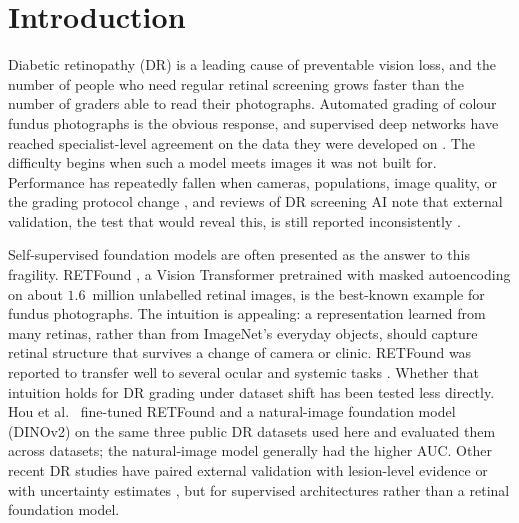 \documentclass[journal]{IEEEtran}
\renewcommand{\_}{\origunderscore\allowbreak}
\begin{document}
\IEEEpeerreviewmaketitle


\section{Introduction}
\label{sec:intro}

Diabetic retinopathy (DR) is a leading cause of preventable vision loss, and the
number of people who need regular retinal screening grows faster than the number
of graders able to read their photographs. Automated grading of colour fundus
photographs is the obvious response, and supervised deep networks have reached
specialist-level agreement on the data they were developed on
\cite{gulshan2016,ting2017}. The difficulty begins when such a model meets
images it was not built for. Performance has repeatedly fallen when cameras,
populations, image quality, or the grading protocol change
\cite{beede2020,dai2021spectrum}, and reviews of DR screening AI note that
external validation, the test that would reveal this, is still reported
inconsistently \cite{grzybowski2020review,tripodai2024}.

Self-supervised foundation models are often presented as the answer to this
fragility. RETFound \cite{zhou2023retfound}, a Vision Transformer
\cite{dosovitskiy2021vit} pretrained with masked autoencoding \cite{he2022mae} on
about $1.6$~million unlabelled retinal images, is the best-known example for
fundus photographs. The intuition is appealing: a representation learned from
many retinas, rather than from ImageNet's everyday objects, should capture
retinal structure that survives a change of camera or clinic. RETFound was
reported to transfer well to several ocular and systemic tasks
\cite{zhou2023retfound}. Whether that intuition holds for DR grading under
dataset shift has been tested less directly. Hou et al.\ \cite{hou2025dinov2}
fine-tuned RETFound and a natural-image foundation model (DINOv2) on the same
three public DR datasets used here and evaluated them across datasets; the
natural-image model generally had the higher AUC. Other recent DR studies have
paired external validation with lesion-level evidence
\cite{jafarpoor2026multitask} or with uncertainty estimates
\cite{saleem2026cgdrnet}, but for supervised architectures rather than a retinal
foundation model.
\end{document}
